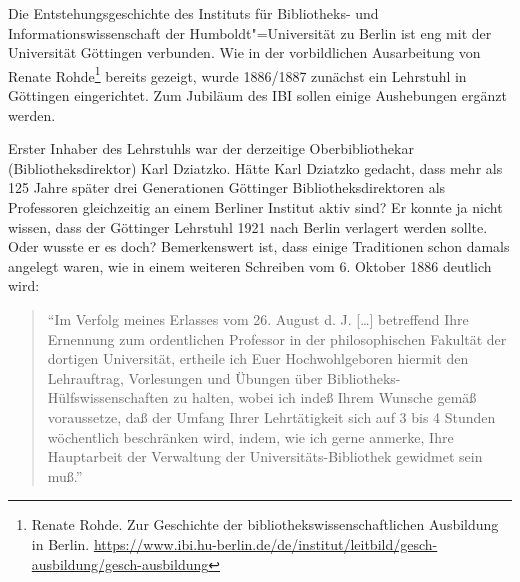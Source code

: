 \documentclass[a4paper,
fontsize=11pt,
oneside,
numbers=noperiodatend,
parskip=half-,
bibliography=totoc,
final
]{scrartcl}
\begin{document}
Die Entstehungsgeschichte des Instituts für Bibliotheks- und
Informationswissenschaft der Humboldt"=Universität zu Berlin ist eng mit
der Universität Göttingen verbunden. Wie in der vorbildlichen
Ausarbeitung von Renate Rohde\footnote{Renate Rohde. Zur Geschichte der
  bibliothekswissenschaftlichen Ausbildung in Berlin.
  \url{https://www.ibi.hu-berlin.de/de/institut/leitbild/gesch-ausbildung/gesch-ausbildung}}
bereits gezeigt, wurde 1886/1887 zunächst ein Lehrstuhl in Göttingen
eingerichtet. Zum Jubiläum des IBI sollen einige Aushebungen ergänzt
werden.

Erster Inhaber des Lehrstuhls war der derzeitige Oberbibliothekar
(Bibliotheksdirektor) Karl Dziatzko. Hätte Karl Dziatzko gedacht, dass
mehr als 125 Jahre später drei Generationen Göttinger
Bibliotheksdirektoren als Professoren gleichzeitig an einem Berliner
Institut aktiv sind? Er konnte ja nicht wissen, dass der Göttinger
Lehrstuhl 1921 nach Berlin verlagert werden sollte. Oder wusste er es
doch? Bemerkenswert ist, dass einige Traditionen schon damals angelegt
waren, wie in einem weiteren Schreiben vom 6. Oktober 1886 deutlich
wird:

\begin{quote}
\enquote{Im Verfolg meines Erlasses vom 26. August d. J. {[}\ldots{}{]}
betreffend Ihre Ernennung zum ordentlichen Professor in der
philosophischen Fakultät der dortigen Universität, ertheile ich Euer
Hochwohlgeboren hiermit den Lehrauftrag, Vorlesungen und Übungen über
Bibliotheks-Hülfswissenschaften zu halten, wobei ich indeß Ihrem Wunsche
gemäß voraussetze, daß der Umfang Ihrer Lehrtätigkeit sich auf 3 bis 4
Stunden wöchentlich beschränken wird, indem, wie ich gerne anmerke, Ihre
Hauptarbeit der Verwaltung der Universitäts-Bibliothek gewidmet sein
muß.}
\end{quote}
\end{document}
